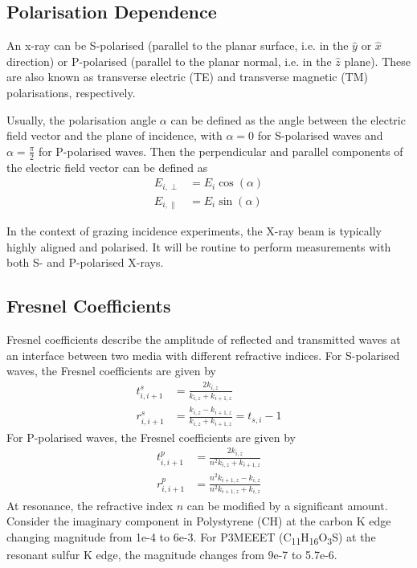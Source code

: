 \documentclass[../main.tex]{subfiles}
\begin{document}
	\subsection{Polarisation Dependence}
	An x-ray can be S-polarised (parallel to the planar surface, i.e. in the $\hat{y}$ or $\hat{x}$ direction) or P-polarised (parallel to the planar normal, i.e. in the $\hat{z}$ plane). These are also known as transverse electric (TE) and transverse magnetic (TM) polarisations, respectively.

	Usually, the polarisation angle $\alpha$ can be defined as the angle between the electric field vector and the plane of incidence, with $\alpha = 0$ for S-polarised waves and $\alpha = \frac{\pi}{2}$ for P-polarised waves. Then the perpendicular and parallel components of the electric field vector can be defined as
	\begin{align}
		E_{i, \perp} &= E_i \cos(\alpha) \\
		E_{i, \parallel} &= E_i \sin(\alpha)
	\end{align}

	In the context of grazing incidence experiments, the X-ray beam is typically highly aligned and polarised. It will be routine to perform measurements with both S- and P-polarised X-rays.

	\subsection{Fresnel Coefficients}
	Fresnel coefficients describe the amplitude of reflected and transmitted waves at an interface between two media with different refractive indices. For S-polarised waves, the Fresnel coefficients are given by
	\begin{align}
		t_{i, i+1}^{s} &= \frac{2 k_{i, z}}{k_{i, z} + k_{i+1, z}} \\
		r_{i, i+1}^{s} &= \frac{k_{i, z} - k_{i+1, z}}{k_{i,z} + k_{i+1,z}} = t_{s,i} - 1
	\end{align}
	For P-polarised waves, the Fresnel coefficients are given by
	\begin{align}
		t_{i, i+1}^{p} &= \frac{2 k_{i, z}}{n^2 k_{i, z} + k_{i+1, z}} \\
		r_{i, i+1}^{p} &= \frac{n^2 k_{i+1, z} - k_{i, z}}{n^2 k_{i+1,z} + k_{i,z}}
	\end{align}
	At resonance, the refractive index $n$ can be modified by a significant amount. Consider the imaginary component in Polystyrene (CH) at the carbon K edge changing magnitude from 1e-4 to 6e-3. For P3MEEET (C\textsubscript{11}H\textsubscript{16}O\textsubscript{3}S) at the resonant sulfur K edge, the magnitude changes from 9e-7 to 5.7e-6.
\end{document}
